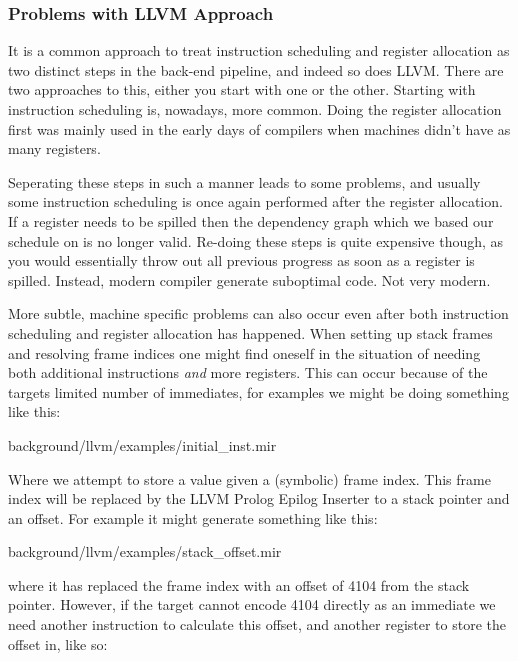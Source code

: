 \subsubsection{Problems with LLVM Approach}
It is a common approach to treat instruction scheduling and register allocation as two
distinct steps in the back-end pipeline, and indeed so does LLVM. There are two approaches
to this, either you start with one or the other. Starting with instruction scheduling is,
nowadays, more common. Doing the register allocation first was mainly used in the early
days of compilers when machines didn't have as many registers.

Seperating these steps in such a manner leads to some problems, and usually some instruction
scheduling is once again performed after the register allocation. If a register needs to be
spilled then the dependency graph which we based our schedule on is no longer valid. Re-doing
these steps is quite expensive though, as you would essentially throw out all previous
progress as soon as a register is spilled. Instead, modern compiler generate suboptimal
code. Not very modern.

More subtle, machine specific problems can also occur even after both instruction scheduling
and register allocation has happened. When setting up stack frames and resolving frame
indices one might find oneself in the situation of needing both additional instructions
\textit{and} more registers. This can occur because of the targets limited number of immediates,
for examples we might be doing something like this:


{background/llvm/examples/initial_inst.mir}

Where we attempt to store a value given a (symbolic) frame index. This frame index will be replaced by
the LLVM Prolog Epilog Inserter to a stack pointer and an offset. For example it might
generate something like this:


{background/llvm/examples/stack_offset.mir}

where it has replaced the frame index with an offset of 4104 from the stack pointer. However,
if the target cannot encode 4104 directly as an immediate we need another instruction to
calculate this offset, and another register to store the offset in, like so:

